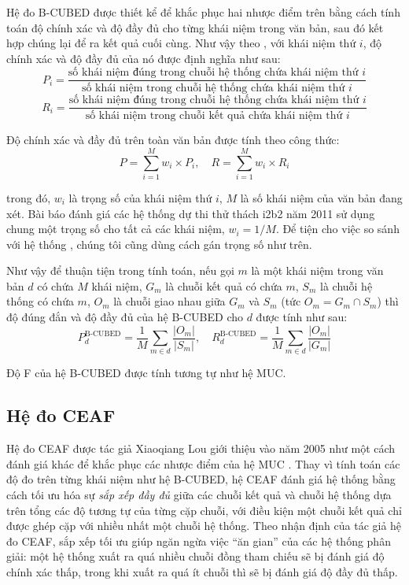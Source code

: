 Hệ đo B-CUBED được thiết kể để khắc phục hai nhược điểm trên bằng cách tính toán độ chính xác và độ đầy đủ cho từng khái niệm trong văn bản, sau đó kết hợp chúng lại để ra kết quả cuối cùng. Như vậy theo \cite{AmitBagga1998}, với khái niệm thứ $i$, độ chính xác và độ đầy đủ của nó được định nghĩa như sau:
\[P_i=\frac{\text{số khái niệm đúng trong chuỗi hệ thống chứa khái niệm thứ $i$}}{\text{số khái niệm trong chuỗi hệ thống chứa khái niệm thứ $i$}}\]
\[R_i=\frac{\text{số khái niệm đúng trong chuỗi hệ thống chứa khái niệm thứ $i$}}{\text{số khái niệm trong chuỗi kết quả chứa khái niệm thứ $i$}}\]

Độ chính xác và đầy đủ trên toàn văn bản được tính theo công thức:
\[P=\sum_{i=1}^{M} w_i \times P_i,\quad R=\sum_{i=1}^{M} w_i\times R_i\]

\noindent trong đó, $w_i$ là trọng số của khái niệm thứ $i$, $M$ là số khái niệm của văn bản đang xét. Bài báo đánh giá các hệ thống dự thi thử thách i2b2 năm 2011 sử dụng chung một trọng số cho tất cả các khái niệm, $w_i=1/M$. Để tiện cho việc so sánh với hệ thống \cite{YanXu2012}, chúng tôi cũng dùng cách gán trọng số như trên.

Như vậy để thuận tiện trong tính toán, nếu gọi $m$ là một khái niệm trong văn bản $d$ có chứa $M$ khái niệm, $G_m$ là chuỗi kết quả có chứa $m$, $S_m$ là chuỗi hệ thống có chứa $m$, $O_m$ là chuỗi giao nhau giữa $G_m$ và $S_m$ (tức $O_m=G_m\cap S_m$) thì độ đúng đắn và độ đầy đủ của hệ B-CUBED cho $d$ được tính như sau:
\[P_d^{\text{B-CUBED}}=\frac{1}{M}\sum_{m\in d}\frac{|O_m|}{|S_m|},\quad R_d^{\text{B-CUBED}}=\frac{1}{M}\sum_{m\in d}\frac{|O_m|}{|G_m|}\]

Độ F của hệ B-CUBED được tính tương tự như hệ MUC.

\subsection*{Hệ đo CEAF}
Hệ đo CEAF được tác giả Xiaoqiang Lou giới thiệu vào năm 2005 như một cách đánh giá khác để khắc phục các nhược điểm của hệ MUC \cite{XiaoquangLuo2005}. Thay vì tính toán các độ đo trên từng khái niệm như hệ B-CUBED, hệ CEAF đánh giá hệ thống bằng cách tối ưu hóa sự \emph{sắp xếp đầy đủ} giữa các chuỗi kết quả và chuỗi hệ thống dựa trên tổng các độ tương tự của từng cặp chuỗi, với điều kiện một chuỗi kết quả chỉ được ghép cặp với nhiều nhất một chuỗi hệ thống. Theo nhận định của tác giả hệ đo CEAF, sắp xếp tối ưu giúp ngăn ngừa việc ``ăn gian'' của các hệ thống phân giải: một hệ thống xuất ra quá nhiều chuỗi đồng tham chiếu sẽ bị đánh giá độ chính xác thấp, trong khi xuất ra quá ít chuỗi thì sẽ bị đánh giá độ đầy đủ thấp.

